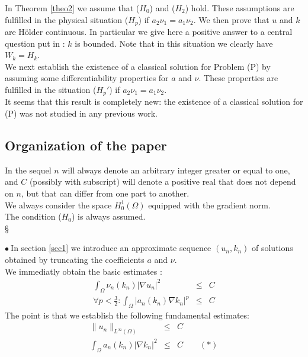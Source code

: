 \documentclass{elsart}
\begin{document}
In Theorem \ref{theo2} we assume that ($H_0$) and ($H_2$) hold. These
assumptions are fulfilled in the physical situation ($H_p$) if 
$a_2\nu_1 = a_1\nu_2$. We then prove that $u$ and $k$ are 
H\"{o}lder continuous. In particular we give here a positive answer to a
central question put in \cite{gal} : $k$ is bounded. Note that in 
this situation we clearly have $W_k = H_k$. \\ 

We next establish the existence of a classical
solution for Problem (P) by assuming some differentiability properties for 
$a$ and $\nu$. These properties are fulfilled in the situation ($H_p'$) if 
$a_2\nu_1 = a_1\nu_2$. \\ 
It seems that this result is completely new: the existence of a
classical solution for (P) was not studied in any previous work. 

\subsection{Organization of the paper}

In the sequel $n$ will always denote an arbitrary integer
greater or equal to one, and $C$ (possibly with subscript) will denote 
a positive real that does not depend on $n$, but that can differ from
one part to another. \\ 
We always consider the space $H^1_0(\Omega)$ equipped with the
gradient norm. \\ 
The condition ($H_0$) is always assumed.\\§ 

$\bullet \ $In section \ref{sec1} we introduce an approximate sequence $(u_n,k_n)$
of solutions obtained by truncating the coefficients $a$ and $\nu$. \\ 
We immediatly obtain the basic estimates :
\begin{eqnarray*}
\int_{\Omega} \nu_n(k_n)|\nabla u_n|^2 &\leq& C \\ 
\forall p<\frac{3}{2}: \int_{\Omega} \big| a_n(k_n) \nabla k_n \big|^p
&\leq& C 
\end{eqnarray*} 
The point is that we establish the following fundamental estimates:
\begin{eqnarray*} 
\|u_n\|_{L^{\infty}(\Omega)} &\leq& C \\
\int_{\Omega} a_n(k_n)|\nabla k_n|^2 &\leq& C \qquad (*)
\end{eqnarray*}
\end{document}
